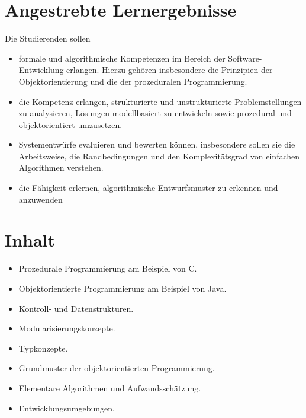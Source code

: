 \section*{Angestrebte
Lernergebnisse\label{/mi-2017/modulbeschreibungen-bachelor/BA_AlgorithmenundProgrammierung1}}\label{angestrebte-lernergebnissepathlabelmi-2017modulbeschreibungen-bachelorbaux5falgorithmenundprogrammierung1}

Die Studierenden sollen

\begin{itemize}
\tightlist
\item
  formale und algorithmische Kompetenzen im Bereich der
  Software-Entwicklung erlangen. Hierzu gehören insbesondere die
  Prinzipien der Objektorientierung und die der prozeduralen
  Programmierung.
\item
  die Kompetenz erlangen, strukturierte und unstrukturierte
  Problemstellungen zu analysieren, Lösungen modellbasiert zu entwickeln
  sowie prozedural und objektorientiert umzusetzen.
\item
  Systementwürfe evaluieren und bewerten können, insbesondere sollen sie
  die Arbeitsweise, die Randbedingungen und den Komplexitätsgrad von
  einfachen Algorithmen verstehen.
\item
  die Fähigkeit erlernen, algorithmische Entwurfsmuster zu erkennen und
  anzuwenden
\end{itemize}

\section*{Inhalt\label{/mi-2017/modulbeschreibungen-bachelor/BA_AlgorithmenundProgrammierung1}}\label{inhaltpathlabelmi-2017modulbeschreibungen-bachelorbaux5falgorithmenundprogrammierung1}

\begin{itemize}
\tightlist
\item
  Prozedurale Programmierung am Beispiel von C.
\item
  Objektorientierte Programmierung am Beispiel von Java.
\item
  Kontroll- und Datenstrukturen.
\item
  Modularisierungskonzepte.
\item
  Typkonzepte.
\item
  Grundmuster der objektorientierten Programmierung.
\item
  Elementare Algorithmen und Aufwandsschätzung.
\item
  Entwicklungsumgebungen.
\end{itemize}

